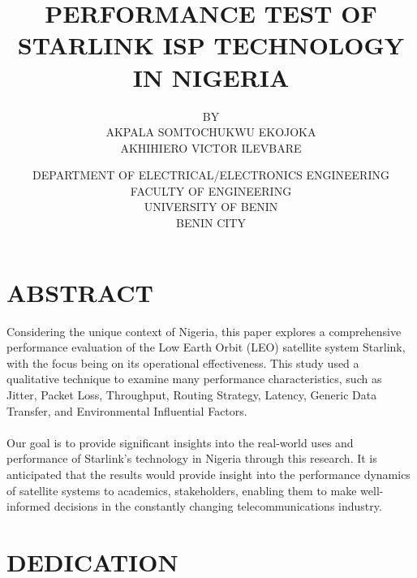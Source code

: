 \documentclass[a4paper, 12pt]{report}
\title{PERFORMANCE TEST OF STARLINK ISP TECHNOLOGY IN NIGERIA}
\author{BY \\
		AKPALA SOMTOCHUKWU EKOJOKA\\
		AKHIHIERO VICTOR ILEVBARE}
\date{DEPARTMENT OF ELECTRICAL/ELECTRONICS ENGINEERING\\
FACULTY OF ENGINEERING\\
UNIVERSITY OF BENIN\\
BENIN CITY}
\begin{document}
\maketitle
\chapter*{ABSTRACT}
Considering the unique context of Nigeria, this paper explores a comprehensive performance evaluation of the Low Earth Orbit (LEO) satellite system Starlink, with the focus being on its operational effectiveness. This study used a qualitative technique to examine many performance characteristics, such as Jitter, Packet Loss, Throughput, Routing Strategy, Latency, Generic Data Transfer, and Environmental Influential Factors.\\ \\
Our goal is to provide significant insights into the real-world uses and performance of Starlink's technology in Nigeria through this research. It is anticipated that the results would provide insight into the performance dynamics of satellite systems to academics, stakeholders, enabling them to make well-informed decisions in the constantly changing telecommunications industry.

\chapter*{DEDICATION}
\begin{doublespacing}

\end{doublespacing}


\end{document}
